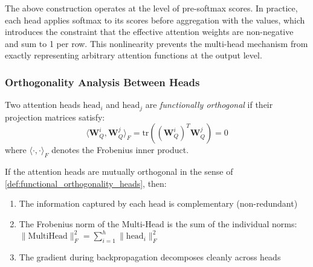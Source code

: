 \begin{remark}
The above construction operates at the level of pre-softmax scores. In practice, each head applies softmax to its scores before aggregation with the values, which introduces the constraint that the effective attention weights are non-negative and sum to 1 per row. This nonlinearity prevents the multi-head mechanism from exactly representing arbitrary attention functions at the output level.
\end{remark}

\subsubsection{Orthogonality Analysis Between Heads}

\begin{definition}\label{def:functional_orthogonality_heads}
    Two attention heads $\text{head}_i$ and $\text{head}_j$ are \textit{functionally orthogonal} if their projection matrices satisfy:
    \begin{equation}
        \langle \mathbf{W}_Q^i, \mathbf{W}_Q^j \rangle_F = \text{tr}((\mathbf{W}_Q^i)^T \mathbf{W}_Q^j) = 0
        \label{eq:head_orthogonality}
    \end{equation}
    where $\langle \cdot, \cdot \rangle_F$ denotes the Frobenius inner product.
\end{definition}

\begin{proposition}\label{prop:orthogonality_benefits}
    If the attention heads are mutually orthogonal in the sense of \autoref{def:functional_orthogonality_heads}, then:
    \begin{enumerate}
        \item The information captured by each head is complementary (non-redundant)
        \item The Frobenius norm of the Multi-Head is the sum of the individual norms: $\|\text{MultiHead}\|_F^2 = \sum_{i=1}^h \|\text{head}_i\|_F^2$
        \item The gradient during backpropagation decomposes cleanly across heads
    \end{enumerate}
\end{proposition}


